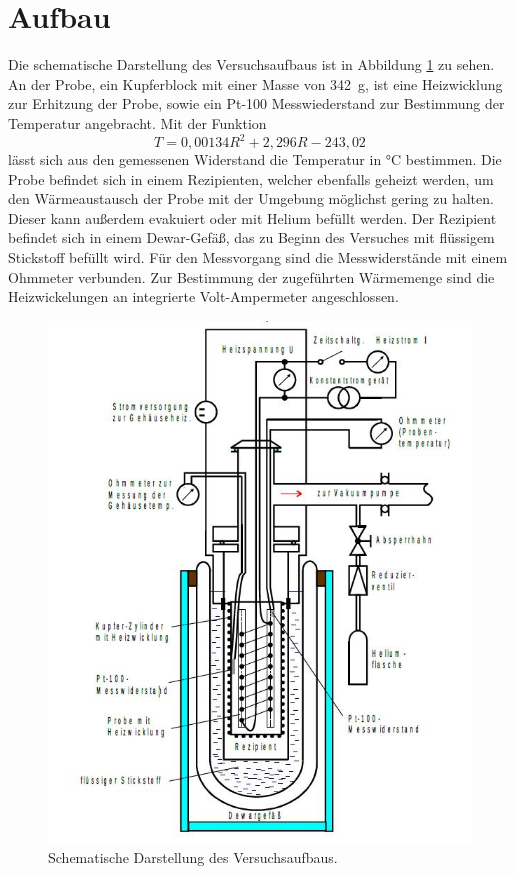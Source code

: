 \section{Aufbau}
\label{sec:Aufbau}

Die schematische Darstellung des Versuchsaufbaus ist in Abbildung \ref{fig:aufbau} zu sehen. An der Probe, ein Kupferblock mit einer Masse von \SI{342}{\gram},  ist eine Heizwicklung zur Erhitzung der Probe, sowie ein Pt-100 Messwiederstand zur Bestimmung der Temperatur angebracht.
Mit der Funktion
\begin{equation}
	T = 0,00134 R^2 + 2,296 R -243,02
	\label{eq:pt100}
\end{equation}
lässt sich aus den gemessenen Widerstand die Temperatur in °C bestimmen.
Die Probe befindet sich in einem Rezipienten, welcher ebenfalls geheizt werden, um den Wärmeaustausch der Probe mit der Umgebung möglichst gering zu halten. Dieser kann außerdem evakuiert oder mit Helium befüllt werden. Der Rezipient befindet sich in einem Dewar-Gefäß, das zu Beginn des Versuches mit flüssigem Stickstoff befüllt wird. Für den Messvorgang sind die Messwiderstände mit einem Ohmmeter verbunden.
Zur Bestimmung der zugeführten Wärmemenge sind die Heizwickelungen an integrierte Volt-Ampermeter angeschlossen.

\begin{figure}
  \centering
  \includegraphics{content/Aufbau.jpg}
  \caption{Schematische Darstellung des Versuchsaufbaus.\cite{manual}}
  \label{fig:aufbau}
\end{figure}


